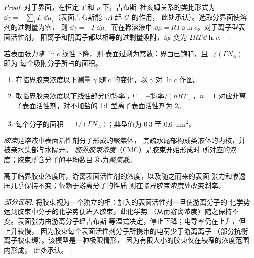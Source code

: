 \begin{proof}
对于界面，在恒定 $T$ 和
$p$ 下，吉布斯–杜亥姆关系的类比形式为 $\dd\gamma = -\sum_i\Gamma_i\,\dd\mu_i$（表面吉布斯能 $\gamma A$ 起 $G$ 的作用，
此处承认）。选取分界面使溶剂的过剩量为零，
则 $\dd\gamma = -\Gamma\,\dd\mu$，而在稀溶液中 $\dd\mu = RT\,\dd\ln c$。对于离子型表面活性剂，
阳离子和阴离子都以相等的过剩量吸附，$\dd\mu$ 变为
$2RT\,\dd\ln c$.
\end{proof}

若表面张力随 $\ln c$ 线性下降，则
表面过剩为常数：界面已饱和，且 $1/(\Gamma N_A)$ 即为
每个吸附分子所占的面积。

\begin{method}\label{met:b3:colloids:surface-excess}
\begin{enumerate}
  \item 在临界胶束浓度以下测量 $\gamma$ 随 $c$ 的变化，以 $\gamma$ 对 $\ln c$ 作图。
  \item 取临界胶束浓度以下线性部分的斜率；$\Gamma = -\text{斜率}/(nRT)$，$n
        = 1$ 对应非离子表面活性剂，对不加盐的 1:1 型离子表面活性剂为 2。
  \item 每个分子的面积 $= 1/(\Gamma N_A)$；典型值为 0.3 至 \qty{0.6}{nm^2}。
\end{enumerate}
\end{method}

\begin{definition}\label{def:b3:colloids:micelle}
\emph{胶束}是溶液中表面活性剂分子形成的聚集体，
其疏水尾部构成类液体的内核，并被亲水头部与水隔开。
\emph{临界胶束浓度}（CMC）是胶束开始形成时
所对应的浓度；胶束所含分子的平均数目
称为\emph{聚集数}。
\end{definition}

\begin{proposition}[临界胶束浓度处的转折]\label{prop:b3:colloids:cmc-break}
高于临界胶束浓度时，游离表面活性剂的浓度，以及随之而来的表面
张力和渗透压几乎保持不变；依赖于游离分子的性质
则在临界胶束浓度处改变斜率。
\end{proposition}

\begin{proof}[部分证明]
将胶束视为一个独立的相：加入的表面活性剂一旦使游离分子的
化学势达到胶束中分子的化学势便进入胶束，此化学势
（从而游离浓度）随之保持不变。表面张力由游离分子经吉布斯
等温式决定，停止下降；电导率仍在上升，但上升较慢，
因为胶束每个表面活性剂分子所携带的电荷少于游离离子
（部分抗衡离子被束缚）。该模型是一种极限情形，
因为有限大小的胶束仅在较窄的浓度范围内形成，
此处承认。
\end{proof}

